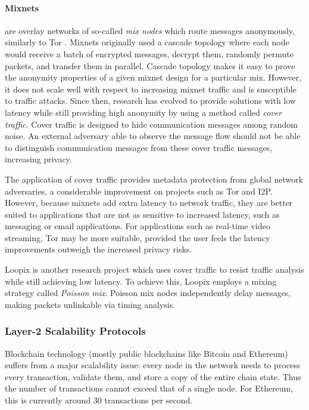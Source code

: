 \paragraph{Mixnets} are overlay networks of so-called \textit{mix nodes} which route messages anonymously, similarly to Tor \cite{mixnets}. Mixnets originally used a cascade topology where each node would receive a batch of encrypted messages, decrypt them, randomly permute packets, and transfer them in parallel. Cascade topology makes it easy to prove the anonymity properties of a given mixnet design for a particular mix. However, it does not scale well with respect to increasing mixnet traffic and is susceptible to traffic attacks. Since then, research has evolved to provide solutions with low latency while still providing high anonymity by using a method called \textit{cover traffic}. Cover traffic is designed to hide communication messages among random noise. An external adversary able to observe the message flow should not be able to
distinguish communication messages from these cover traffic messages, increasing privacy.

The application of cover traffic provides metadata protection from global network adversaries, a considerable improvement on projects such as Tor and I2P. However, because mixnets add extra latency to network traffic, they are better suited to applications that are not as sensitive to increased latency, such as messaging or email applications. For applications such as real-time video streaming, Tor may be more suitable, provided the user feels the latency improvements outweigh the increased privacy risks.

Loopix \cite{loopix} is another research project which uses cover traffic to resist traffic analysis while still achieving low latency. To achieve this, Loopix employs a mixing strategy called \textit{Poisson mix}. Poisson mix nodes independently delay messages, making packets unlinkable via timing analysis.

\subsubsection{Layer-2 Scalability Protocols}
\label{sec:l2protocols}

Blockchain technology (mostly public blockchains like Bitcoin and Ethereum) suffers from a major scalability issue: every node in the network needs to process every transaction, validate them, and store a copy of the entire chain state. Thus the number of transactions cannot exceed that of a single node. For Ethereum, this is currently around 30 transactions per second.

